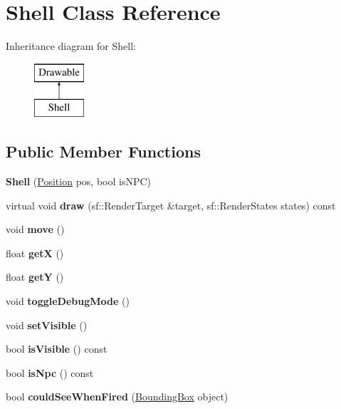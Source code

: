 \hypertarget{class_shell}{}\section{Shell Class Reference}
\label{class_shell}
Inheritance diagram for Shell\+:\begin{figure}[H]
\begin{center}
\leavevmode
\includegraphics[height=2.000000cm]{class_shell}
\end{center}
\end{figure}
\subsection*{Public Member Functions}
\begin{DoxyCompactItemize}
\item 
\mbox{\label{class_shell_aa393a4a63b6217e3ee9d03cf65564d07}} 
{\bfseries Shell} (\mbox{\hyperlink{class_position}{Position}} pos, bool is\+N\+PC)
\item 
\mbox{\label{class_shell_a9520ac56a223315a10ed177dae067fc5}} 
virtual void {\bfseries draw} (sf\+::\+Render\+Target \&target, sf\+::\+Render\+States states) const
\item 
\mbox{\label{class_shell_a4cf835ccfa6212c713c428777f98f8fc}} 
void {\bfseries move} ()
\item 
\mbox{\label{class_shell_a0d5a59882864dd32f5e4c8f9a958e435}} 
float {\bfseries getX} ()
\item 
\mbox{\label{class_shell_a69b65e13952ea6784e2d5155a5f92a7d}} 
float {\bfseries getY} ()
\item 
\mbox{\label{class_shell_a43e70755fa534909ab2d6a75d7e485c8}} 
void {\bfseries toggle\+Debug\+Mode} ()
\item 
\mbox{\label{class_shell_aef07642873e5d37247d3a0e81f892173}} 
void {\bfseries set\+Visible} ()
\item 
\mbox{\label{class_shell_a0801948fa62e656bef93e75f722d456f}} 
bool {\bfseries is\+Visible} () const
\item 
\mbox{\label{class_shell_a3e949dd122d6db50fb23ddceb1e3a1ef}} 
bool {\bfseries is\+Npc} () const
\item 
\mbox{\label{class_shell_a4e536448e437dff85ed7911ef6cfd854}} 
bool {\bfseries could\+See\+When\+Fired} (\mbox{\hyperlink{class_bounding_box}{Bounding\+Box}} object)
\end{DoxyCompactItemize}
